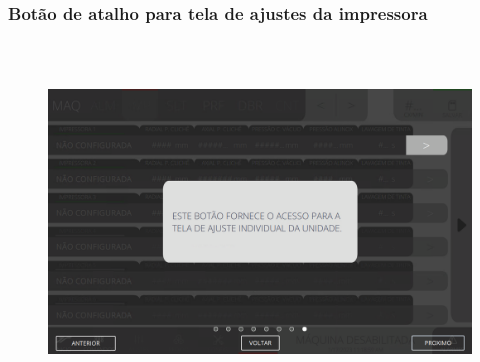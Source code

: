 \newpage
\thispagestyle{fancy}
\vspace*{40 pt}
\subsubsection{\small{Botão de atalho para tela de ajustes da impressora}}\label{telaAjustesImpressorasBotaoDeAtalhoParaTelaDeAjustesDaImpressora}
\vspace*{\fill}
\begin{figure}[h]
  \centering
  \includegraphics[width=576px,height=360px]{src/imagesFlexo/04-printter/01-printters/settings/e-8.png}
\end{figure}
\vspace*{\fill}

\newpage
\thispagestyle{fancy}
\vspace*{40 pt}
